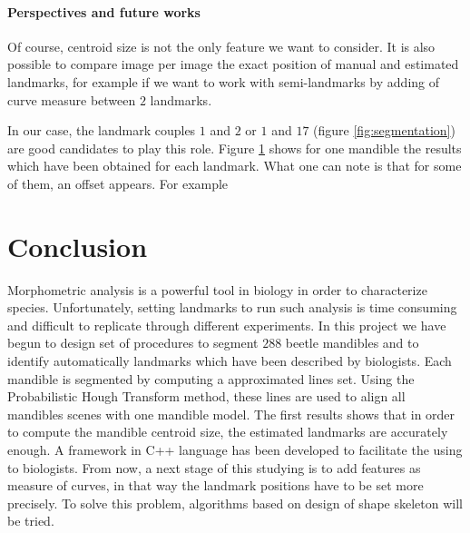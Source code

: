 \documentclass[twoside,twocolumn,10pt]{article}
\begin{document}
\paragraph{Perspectives and future works}
Of course, centroid size is not the only feature we want to
consider. It is also possible to compare image per image the exact
position of manual and estimated landmarks, for example if we want to
work with semi-landmarks by adding of curve measure between $2$
landmarks.

In our case, the landmark couples $1$ and $2$ or $1$ and $17$ (figure
\ref{fig:segmentation}) are good candidates to play this role. Figure
\ref{} shows for one mandible the results which have been obtained
for each landmark. What one can note is that for some of them, an
offset appears. For example 
\section{Conclusion}
Morphometric analysis is a powerful tool in biology in order to
characterize species. Unfortunately, setting landmarks to run such
analysis is time consuming and difficult to replicate through
different experiments. In this project we have begun to design set of
procedures to segment $288$ beetle mandibles and to identify automatically
landmarks which have been described by biologists. Each mandible is
segmented by computing a approximated lines set. Using the
Probabilistic Hough Transform method, these lines are
used to align all mandibles scenes with one mandible model. The
first results shows that in order to compute the mandible centroid
size, the estimated landmarks are accurately enough. A framework in
C++ language has been developed to facilitate the using
to biologists. From now, a next stage of this studying is to add features as measure of curves,
in that way the landmark positions have to be set more precisely. To
solve this problem, algorithms based on design of shape skeleton will
be tried.




\end{document}
